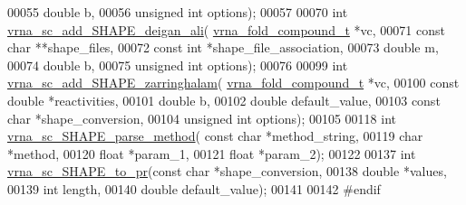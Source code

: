 \begin{DoxyCode}
00055                               \textcolor{keywordtype}{double} b,
00056                               \textcolor{keywordtype}{unsigned} \textcolor{keywordtype}{int} options);
00057 
00070 \textcolor{keywordtype}{int} \mbox{\hyperlink{group__SHAPE__reactivities_ga04ba85da63d8c793bb8001d1e6f800ba}{vrna\_sc\_add\_SHAPE\_deigan\_ali}}( 
      \mbox{\hyperlink{group__fold__compound_structvrna__fc__s}{vrna\_fold\_compound\_t}} *vc,
00071                                   \textcolor{keyword}{const} \textcolor{keywordtype}{char} **shape\_files,
00072                                   \textcolor{keyword}{const} \textcolor{keywordtype}{int} *shape\_file\_association,
00073                                   \textcolor{keywordtype}{double} m,
00074                                   \textcolor{keywordtype}{double} b,
00075                                   \textcolor{keywordtype}{unsigned} \textcolor{keywordtype}{int} options);
00076 
00099 \textcolor{keywordtype}{int} \mbox{\hyperlink{group__SHAPE__reactivities_gaf3c65a045060aef5c4e41693d30af58c}{vrna\_sc\_add\_SHAPE\_zarringhalam}}( 
      \mbox{\hyperlink{group__fold__compound_structvrna__fc__s}{vrna\_fold\_compound\_t}} *vc,
00100                                     \textcolor{keyword}{const} \textcolor{keywordtype}{double} *reactivities,
00101                                     \textcolor{keywordtype}{double} b,
00102                                     \textcolor{keywordtype}{double} default\_value,
00103                                     \textcolor{keyword}{const} \textcolor{keywordtype}{char} *shape\_conversion,
00104                                     \textcolor{keywordtype}{unsigned} \textcolor{keywordtype}{int} options);
00105 
00118 \textcolor{keywordtype}{int} \mbox{\hyperlink{constraints__SHAPE_8h_a71b84eb0dd69e5c256f4ecf8f78cf314}{vrna\_sc\_SHAPE\_parse\_method}}( \textcolor{keyword}{const} \textcolor{keywordtype}{char} *method\_string,
00119                                 \textcolor{keywordtype}{char} *method,
00120                                 \textcolor{keywordtype}{float} *param\_1,
00121                                 \textcolor{keywordtype}{float} *param\_2);
00122 
00137 \textcolor{keywordtype}{int} \mbox{\hyperlink{group__SHAPE__reactivities_ga67675b3ed48744489a3bcfa4174197cb}{vrna\_sc\_SHAPE\_to\_pr}}(\textcolor{keyword}{const} \textcolor{keywordtype}{char} *shape\_conversion,
00138                         \textcolor{keywordtype}{double} *values,
00139                         \textcolor{keywordtype}{int} length,
00140                         \textcolor{keywordtype}{double} default\_value);
00141 
00142 \textcolor{preprocessor}{#endif}
\end{DoxyCode}
